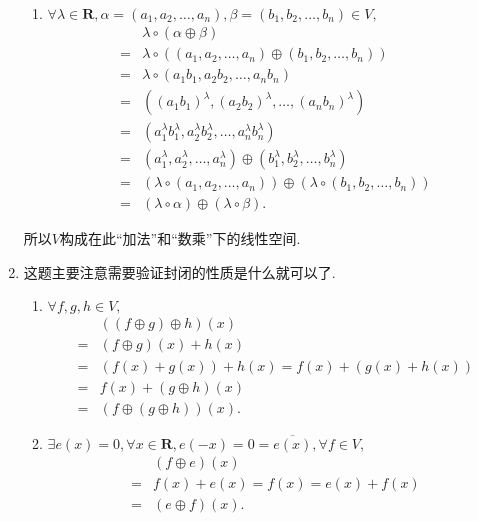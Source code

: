\begin{solution}
\begin{enumerate}
\begin{enumerate}
                    \item $\forall \lambda \in \mathbf{R}, \alpha = (a_1, a_2, \ldots, a_n), \beta = (b_1, b_2, \ldots, b_n) \in V,$
                    \begin{align*}
                        & \lambda \circ (\alpha \oplus \beta) \\ ={} & \lambda \circ ((a_1, a_2, \ldots, a_n) \oplus (b_1, b_2, \ldots, b_n)) \\ ={} & \lambda \circ (a_1b_1, a_2b_2, \ldots , a_nb_n) \\ ={} & ((a_1b_1)^\lambda, (a_2b_2)^\lambda, \ldots , (a_nb_n)^\lambda) \\ ={} & (a_1^\lambda b_1^\lambda, a_2^\lambda b_2^\lambda, \ldots , a_n^\lambda b_n^\lambda) \\ ={} & (a_1^\lambda, a_2^\lambda, \ldots, a_n^\lambda) \oplus (b_1^\lambda, b_2^\lambda, \ldots, b_n^\lambda) \\ ={} & (\lambda \circ (a_1, a_2, \ldots, a_n)) \oplus (\lambda \circ (b_1, b_2, \ldots, b_n)) \\ ={} & (\lambda \circ \alpha) \oplus (\lambda \circ \beta).
                    \end{align*}
                \end{enumerate}
                所以$V$构成在此“加法”和“数乘”下的线性空间.

                \item 这题主要注意需要验证封闭的性质是什么就可以了.
                \begin{enumerate}
                    \item $\forall f, g, h \in V,$
                    \begin{align*}
                        & ((f \oplus g) \oplus h)(x) \\ ={} & (f \oplus g)(x)+h(x) \\ ={} & (f(x)+g(x))+h(x) = f(x)+(g(x)+h(x)) \\ ={} & f(x)+ (g \oplus h)(x) \\={} & (f \oplus (g \oplus h))(x).
                    \end{align*}

                    \item $\exists e(x)=0, \forall x \in \mathbf{R}, e(-x)=0=\overline{e(x)}, \forall f \in V,$
                    \begin{align*}
                        & (f \oplus e)(x) \\={} & f(x) + e(x) = f(x) = e(x) + f(x) \\ ={} & (e \oplus f)(x).
                    \end{align*}


\end{enumerate}
\end{enumerate}
\end{solution}
